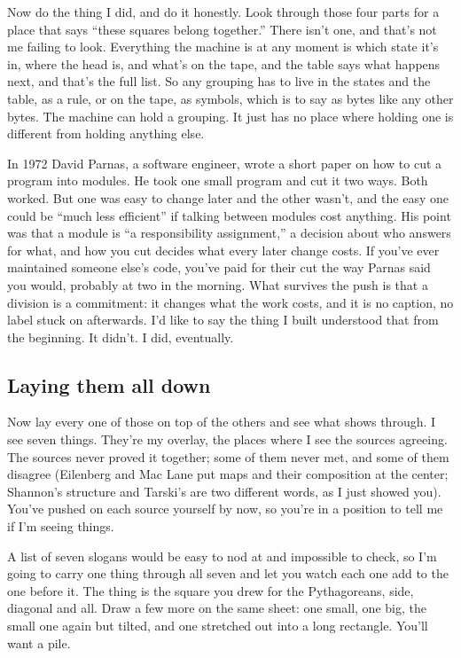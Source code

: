 \documentclass[11pt,twoside]{article}
\theoremstyle{thielethm}
\theoremstyle{thieledef}
\theoremstyle{thieledef}
\theoremstyle{thieledef}
\theoremstyle{thielethm}
\theoremstyle{thieleobs}
\theoremstyle{thielethm}
\begin{document}
Now do the thing I did, and do it honestly. Look through those four parts for a place that says ``these squares belong together.'' There isn't one, and that's not me failing to look. Everything the machine is at any moment is which state it's in, where the head is, and what's on the tape, and the table says what happens next, and that's the full list. So any grouping has to live in the states and the table, as a rule, or on the tape, as symbols, which is to say as bytes like any other bytes. The machine can hold a grouping. It just has no place where holding one is different from holding anything else.

In 1972 David Parnas, a software engineer, wrote a short paper on how to cut a program into modules. He took one small program and cut it two ways. Both worked. But one was easy to change later and the other wasn't, and the easy one could be ``much less efficient'' if talking between modules cost anything. His point was that a module is ``a responsibility assignment,'' a decision about who answers for what, and how you cut decides what every later change costs. If you've ever maintained someone else's code, you've paid for their cut the way Parnas said you would, probably at two in the morning. What survives the push is that a division is a commitment: it changes what the work costs, and it is no caption, no label stuck on afterwards. I'd like to say the thing I built understood that from the beginning. It didn't. I did, eventually.

\subsection{Laying them all down}

Now lay every one of those on top of the others and see what shows through. I see seven things. They're my overlay, the places where I see the sources agreeing. The sources never proved it together; some of them never met, and some of them disagree (Eilenberg and Mac Lane put maps and their composition at the center; Shannon's structure and Tarski's are two different words, as I just showed you). You've pushed on each source yourself by now, so you're in a position to tell me if I'm seeing things.

A list of seven slogans would be easy to nod at and impossible to check, so I'm going to carry one thing through all seven and let you watch each one add to the one before it. The thing is the square you drew for the Pythagoreans, side, diagonal and all. Draw a few more on the same sheet: one small, one big, the small one again but tilted, and one stretched out into a long rectangle. You'll want a pile.
\end{document}
